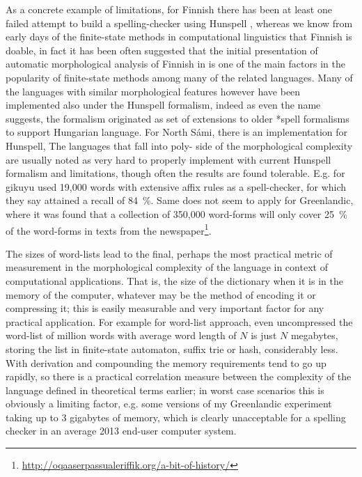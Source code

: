 \documentclass[officiallayout]{unihelcompling}
\begin{document}
As a concrete example of limitations, for Finnish there has been at least one
failed attempt to build a spelling-checker using Hunspell
\citep{pitkanen2006hunspell}, whereas we know from early days of the
finite-state methods in computational linguistics that Finnish is doable, in
fact it has been often suggested that the initial presentation of automatic
morphological analysis of Finnish in \citet{koskenniemi1983twolevel} is one of
the main factors in the popularity of finite-state methods among many of the
related languages. Many of the languages with similar morphological features
however have been implemented also under the Hunspell formalism, indeed as even
the name suggests, the formalism originated as set of extensions to older
*spell formalisms to support Hungarian language. For North Sámi, there is an
implementation for Hunspell, The languages that fall into poly- side of the
morphological complexity are usually noted as very hard to properly implement
with current Hunspell formalism and limitations, though often the results are
found tolerable. E.g. for gikuyu \citet{chege2010developing} used 19,000 words
with extensive affix rules as a spell-checker, for which they say attained a
recall of 84~\%. Same does not seem to apply for Greenlandic, where it was
found that a collection of 350,000 word-forms will only cover 25~\% of the
word-forms in texts from the
newspaper\footnote{\url{http://oqaaserpassualeriffik.org/a-bit-of-history/}}.

The sizes of word-lists lead to the final, perhaps the most practical metric of
measurement in the morphological complexity of the language in context of
computational applications. That is, the size of the dictionary when it is in
the memory of the computer, whatever may be the method of encoding it or
compressing it; this is easily measurable and very important factor for any
practical application.  For example for word-list approach, even uncompressed
the word-list of million words with average word length of $N$ is just $N$
megabytes, storing the list in finite-state automaton, suffix trie or hash,
considerably less. With derivation and compounding the memory requirements tend
to go up rapidly, so there is a practical correlation measure between the
complexity of the language defined in theoretical terms earlier; in worst case
scenarios this is obviously a limiting factor, e.g. some versions of my
Greenlandic experiment taking up to 3 gigabytes of memory, which is clearly
unacceptable for a spelling checker in an average 2013 end-user computer
system.
\end{document}
